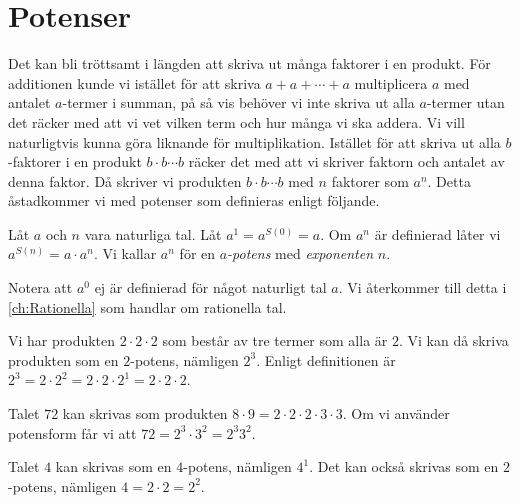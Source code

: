 \section{Potenser}
Det kan bli tröttsamt i längden att skriva ut många faktorer i en
produkt.
För additionen kunde vi istället för att skriva \(a+a+\cdots+a\)
multiplicera \(a\) med antalet \(a\)-termer i summan, på så vis behöver vi inte
skriva ut alla \(a\)-termer utan det räcker med att vi vet vilken term och hur
många vi ska addera.
Vi vill naturligtvis kunna göra liknande för multiplikation.
Istället för att skriva ut alla \(b\)-faktorer i en produkt \(b\cdot
b\cdots b\) räcker det med att vi skriver faktorn och antalet av denna
faktor.
Då skriver vi produkten \(b\cdot b\cdots b\) med \(n\) faktorer som \(a^n\).
Detta åstadkommer vi med potenser som definieras enligt följande.
\begin{definition}
  Låt \(a\) och \(n\) vara naturliga tal.
  Låt \(a^1=a^{S(0)}=a\).
  Om \(a^n\) är definierad låter vi \(a^{S(n)}=a\cdot a^n\).
  Vi kallar \(a^n\) för en \emph{\(a\)-potens} med \emph{exponenten} \(n\).
\end{definition}
\begin{remark}
  Notera att \(a^0\) ej är definierad för något naturligt tal \(a\).
  Vi återkommer till detta i \cref{ch:Rationella} som handlar om rationella
  tal.
\end{remark}

\begin{example}
  Vi har produkten \(2\cdot 2\cdot 2\) som består av tre termer som alla är
  \(2\).
  Vi kan då skriva produkten som en \(2\)-potens, nämligen \(2^3\).
  Enligt definitionen är \(2^3=2\cdot 2^2=2\cdot 2\cdot 2^1 = 2\cdot 2\cdot
  2\).
\end{example}

\begin{example}
  Talet \(72\) kan skrivas som produkten \(8\cdot 9=2\cdot 2\cdot 2\cdot
  3\cdot 3\).
  Om vi använder potensform får vi att \(72=2^3\cdot 3^2=2^3 3^2\).
\end{example}

\begin{example}
  Talet \(4\) kan skrivas som en \(4\)-potens, nämligen \(4^1\).
  Det kan också skrivas som en \(2\)-potens, nämligen \(4=2\cdot 2=2^2\).
\end{example}


